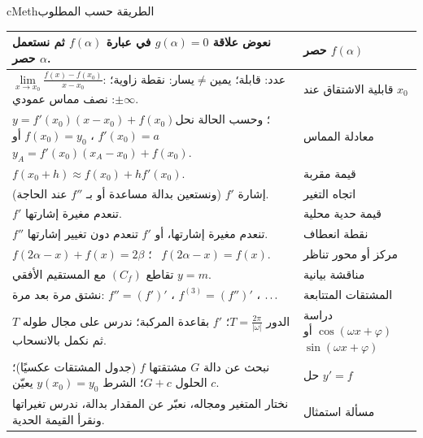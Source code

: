 \documentclass[12pt,a4paper]{article}
\newenvironment{BOX}[2]{\begin{otherlanguage}{english}\begin{arbox}{#1}{#2}}{\end{arbox}\end{otherlanguage}}
\renewcommand{\ldots}{\mathinner{\ldotp\ldotp\ldotp}}
\newcommand{\Lim}[1]{\lim\limits_{#1}}
\begin{document}
\begin{BOX}{cMeth}{الطريقة حسب المطلوب}
\begin{center}
\begin{tabular}{|p{}|p{}|}
نعوض علاقة $g(\alpha)=0$ في عبارة $f(\alpha)$ ثم نستعمل حصر $\alpha$. & حصر $f(\alpha)$\\\hline
$\Lim{x\to x_0}\frac{f(x)-f(x_0)}{x-x_0}$: عدد: قابلة؛ يمين$\neq$يسار: نقطة زاوية؛ $\pm\infty$: نصف مماس عمودي. & قابلية الاشتقاق عند $x_0$\\\hline
$y=f'(x_0)(x-x_0)+f(x_0)$؛ وحسب الحالة نحل $f'(x_0)=a$ ، $f(x_0)=y_0$ أو $y_A=f'(x_0)(x_A-x_0)+f(x_0)$. & معادلة المماس\\\hline
$f(x_0+h)\approx f(x_0)+hf'(x_0)$. & قيمة مقربة\\\hline
إشارة $f'$ (ونستعين بدالة مساعدة أو بـ $f''$ عند الحاجة). & اتجاه التغير\\\hline
$f'$ تنعدم مغيرة إشارتها. & قيمة حدية محلية\\\hline
$f''$ تنعدم مغيرة إشارتها، أو $f'$ تنعدم دون تغيير إشارتها. & نقطة انعطاف\\\hline
$f(2\alpha-x)+f(x)=2\beta$ ؛ \ $f(2\alpha-x)=f(x)$. & مركز أو محور تناظر\\\hline
تقاطع $(C_f)$ مع المستقيم الأفقي $y=m$. & مناقشة بيانية\\\hline
نشتق مرة بعد مرة: $f''=(f')'$ ، $f^{(3)}=(f'')'$ ، $\ldots$ & المشتقات المتتابعة\\\hline
الدور $T=\frac{2\pi}{|\omega|}$؛ $f'$ بقاعدة المركبة؛ ندرس على مجال طوله $T$ ثم نكمل بالانسحاب. & دراسة $\cos(\omega x+\varphi)$ أو $\sin(\omega x+\varphi)$\\\hline
نبحث عن دالة $G$ مشتقتها $f$ (جدول المشتقات عكسيًا)؛ الحلول $G+c$؛ الشرط $y(x_0)=y_0$ يعيّن $c$. & حل $y'=f$\\\hline
نختار المتغير ومجاله، نعبّر عن المقدار بدالة، ندرس تغيراتها ونقرأ القيمة الحدية. & مسألة استمثال\\\hline
\end{tabular}
\end{center}
\end{BOX}
\end{document}
